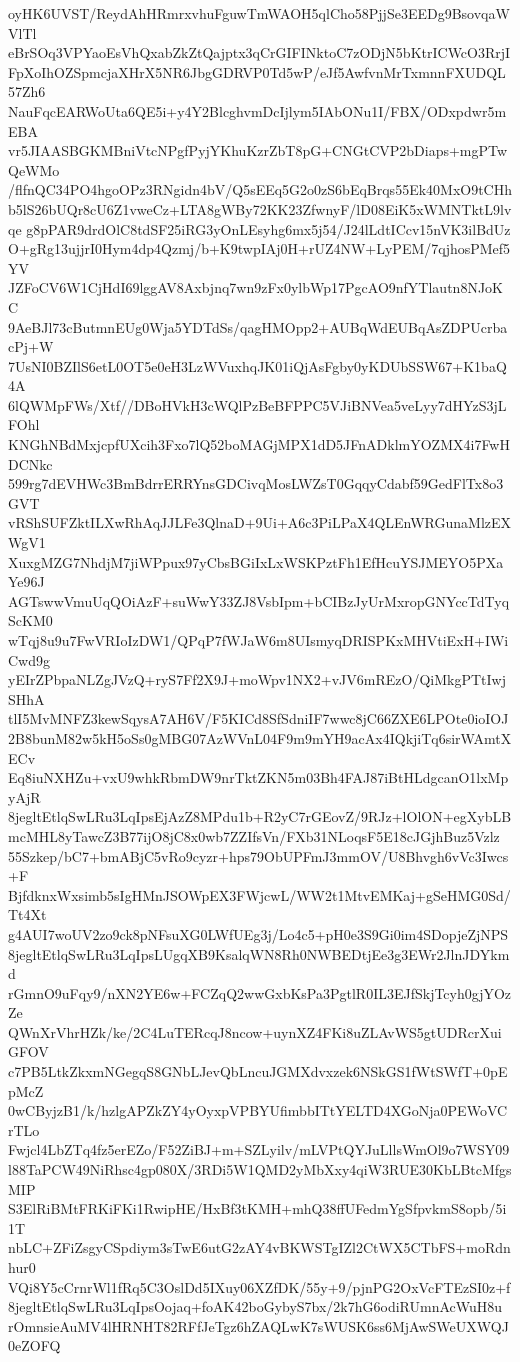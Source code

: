 oyHK6UVST/ReydAhHRmrxvhuFguwTmWAOH5qlCho58PjjSe3EEDg9BsovqaWVlTl
eBrSOq3VPYaoEsVhQxabZkZtQajptx3qCrGIFINktoC7zODjN5bKtrICWcO3RrjI
FpXoIhOZSpmcjaXHrX5NR6JbgGDRVP0Td5wP/eJf5AwfvnMrTxmnnFXUDQL57Zh6
NauFqcEARWoUta6QE5i+y4Y2BlcghvmDcIjlym5IAbONu1I/FBX/ODxpdwr5mEBA
vr5JIAASBGKMBniVtcNPgfPyjYKhuKzrZbT8pG+CNGtCVP2bDiaps+mgPTwQeWMo
/flfnQC34PO4hgoOPz3RNgidn4bV/Q5sEEq5G2o0zS6bEqBrqs55Ek40MxO9tCHh
b5lS26bUQr8cU6Z1vweCz+LTA8gWBy72KK23ZfwnyF/lD08EiK5xWMNTktL9lvqe
g8pPAR9drdOlC8tdSF25iRG3yOnLEsyhg6mx5j54/J24lLdtICcv15nVK3ilBdUz
O+gRg13ujjrI0Hym4dp4Qzmj/b+K9twpIAj0H+rUZ4NW+LyPEM/7qjhosPMef5YV
JZFoCV6W1CjHdI69lggAV8Axbjnq7wn9zFx0ylbWp17PgcAO9nfYTlautn8NJoKC
9AeBJl73cButmnEUg0Wja5YDTdSs/qagHMOpp2+AUBqWdEUBqAsZDPUcrbacPj+W
7UsNI0BZIlS6etL0OT5e0eH3LzWVuxhqJK01iQjAsFgby0yKDUbSSW67+K1baQ4A
6lQWMpFWs/Xtf//DBoHVkH3cWQlPzBeBFPPC5VJiBNVea5veLyy7dHYzS3jLFOhl
KNGhNBdMxjcpfUXcih3Fxo7lQ52boMAGjMPX1dD5JFnADklmYOZMX4i7FwHDCNkc
599rg7dEVHWc3BmBdrrERRYnsGDCivqMosLWZsT0GqqyCdabf59GedFlTx8o3GVT
vRShSUFZktILXwRhAqJJLFe3QlnaD+9Ui+A6c3PiLPaX4QLEnWRGunaMlzEXWgV1
XuxgMZG7NhdjM7jiWPpux97yCbsBGiIxLxWSKPztFh1EfHcuYSJMEYO5PXaYe96J
AGTswwVmuUqQOiAzF+suWwY33ZJ8VsbIpm+bCIBzJyUrMxropGNYccTdTyqScKM0
wTqj8u9u7FwVRIoIzDW1/QPqP7fWJaW6m8UIsmyqDRISPKxMHVtiExH+IWiCwd9g
yEIrZPbpaNLZgJVzQ+ryS7Ff2X9J+moWpv1NX2+vJV6mREzO/QiMkgPTtIwjSHhA
tlI5MvMNFZ3kewSqysA7AH6V/F5KICd8SfSdniIF7wwc8jC66ZXE6LPOte0ioIOJ
2B8bunM82w5kH5oSs0gMBG07AzWVnL04F9m9mYH9acAx4IQkjiTq6sirWAmtXECv
Eq8iuNXHZu+vxU9whkRbmDW9nrTktZKN5m03Bh4FAJ87iBtHLdgcanO1lxMpyAjR
8jegltEtlqSwLRu3LqIpsEjAzZ8MPdu1b+R2yC7rGEovZ/9RJz+lOlON+egXybLB
mcMHL8yTawcZ3B77ijO8jC8x0wb7ZZIfsVn/FXb31NLoqsF5E18cJGjhBuz5Vzlz
55Szkep/bC7+bmABjC5vRo9cyzr+hps79ObUPFmJ3mmOV/U8Bhvgh6vVc3Iwcs+F
BjfdknxWxsimb5sIgHMnJSOWpEX3FWjcwL/WW2t1MtvEMKaj+gSeHMG0Sd/Tt4Xt
g4AUI7woUV2zo9ck8pNFsuXG0LWfUEg3j/Lo4c5+pH0e3S9Gi0im4SDopjeZjNPS
8jegltEtlqSwLRu3LqIpsLUgqXB9KsalqWN8Rh0NWBEDtjEe3g3EWr2JlnJDYkmd
rGmnO9uFqy9/nXN2YE6w+FCZqQ2wwGxbKsPa3PgtlR0IL3EJfSkjTcyh0gjYOzZe
QWnXrVhrHZk/ke/2C4LuTERcqJ8ncow+uynXZ4FKi8uZLAvWS5gtUDRcrXuiGFOV
c7PB5LtkZkxmNGegqS8GNbLJevQbLncuJGMXdvxzek6NSkGS1fWtSWfT+0pEpMcZ
0wCByjzB1/k/hzlgAPZkZY4yOyxpVPBYUfimbbITtYELTD4XGoNja0PEWoVCrTLo
Fwjcl4LbZTq4fz5erEZo/F52ZiBJ+m+SZLyilv/mLVPtQYJuLllsWmOl9o7WSY09
l88TaPCW49NiRhsc4gp080X/3RDi5W1QMD2yMbXxy4qiW3RUE30KbLBtcMfgsMIP
S3ElRiBMtFRKiFKi1RwipHE/HxBf3tKMH+mhQ38ffUFedmYgSfpvkmS8opb/5i1T
nbLC+ZFiZsgyCSpdiym3sTwE6utG2zAY4vBKWSTgIZl2CtWX5CTbFS+moRdnhur0
VQi8Y5cCrnrWl1fRq5C3OslDd5IXuy06XZfDK/55y+9/pjnPG2OxVcFTEzSI0z+f
8jegltEtlqSwLRu3LqIpsOojaq+foAK42boGybyS7bx/2k7hG6odiRUmnAcWuH8u
rOmnsieAuMV4lHRNHT82RFfJeTgz6hZAQLwK7sWUSK6ss6MjAwSWeUXWQJ0eZOFQ
